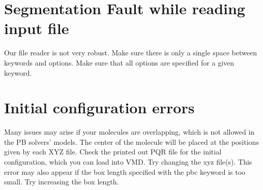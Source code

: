 \section{Segmentation Fault while reading input file}
Our file reader is not very robust.
Make sure there is only a single space between keywords and options.
Make sure that all options are specified for a given keyword.

\section{Initial configuration errors}
Many issues may arise if your molecules are overlapping, which is not allowed in the PB solvers' models.
The center of the molecule will be placed at the positions given by each XYZ file.
Check the printed out PQR file for the initial configuration, which you can load into VMD.
Try changing the xyz file(s).
This error may also appear if the box length specified with the pbc keyword is too small.
Try increasing the box length.











